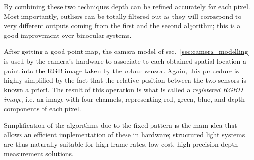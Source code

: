 By combining these two techniques depth can be refined accurately for each
pixel. Most importantly, outliers can be totally filtered out as they will
correspond to very different outputs coming from the first and the second
algorithm; this is a good improvement over binocular systems.

After getting a good point map, the camera model of sec.~\ref{sec:camera_modelling} is used by the camera's hardware to associate to each
obtained spatial location a point into the RGB image taken by the colour sensor.
Again, this procedure is highly simplified by the fact that the relative
position between the two sensors is known a priori. The result of this operation
is what is called a \emph{registered RGBD image}, i.e. an image with four
channels, representing red, green, blue, and depth components of each pixel.

Simplification of the algorithms due to the fixed pattern is the main idea that
allows an efficient implementation of these in hardware; structured light systems are thus
naturally suitable for high frame rates, low cost, high precision depth
measurement solutions.
